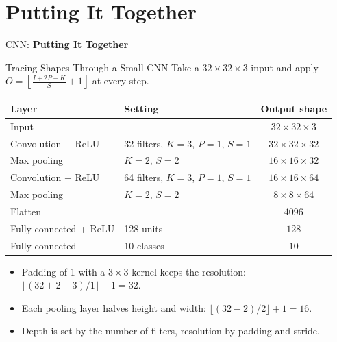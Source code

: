 \section{Putting It Together}
\begin{frame}{}
    \LARGE CNN: \textbf{Putting It Together}
\end{frame}

\begin{frame}[allowframebreaks]{Tracing Shapes Through a Small CNN}
    Take a $32 \times 32 \times 3$ input and apply $O = \left\lfloor \frac{I + 2P - K}{S} + 1 \right\rfloor$ at every step.

    \vspace{0.4em}
    \centering
    \small
    \begin{tabular}{|l|l|c|}
        \hline
        \textbf{Layer} & \textbf{Setting} & \textbf{Output shape} \\
        \hline
        Input & & $32 \times 32 \times 3$ \\
        Convolution + ReLU & 32 filters, $K = 3$, $P = 1$, $S = 1$ & $32 \times 32 \times 32$ \\
        Max pooling & $K = 2$, $S = 2$ & $16 \times 16 \times 32$ \\
        Convolution + ReLU & 64 filters, $K = 3$, $P = 1$, $S = 1$ & $16 \times 16 \times 64$ \\
        Max pooling & $K = 2$, $S = 2$ & $8 \times 8 \times 64$ \\
        Flatten & & $4096$ \\
        Fully connected + ReLU & 128 units & $128$ \\
        Fully connected & 10 classes & $10$ \\
        \hline
    \end{tabular}

    \raggedright
    \vspace{0.4em}
    \begin{itemize}
        \item Padding of 1 with a $3 \times 3$ kernel keeps the resolution: $\lfloor (32 + 2 - 3)/1 \rfloor + 1 = 32$.
        \item Each pooling layer halves height and width: $\lfloor (32 - 2)/2 \rfloor + 1 = 16$.
        \item Depth is set by the number of filters, resolution by padding and stride.
    \end{itemize}

    \framebreak


\end{frame}
